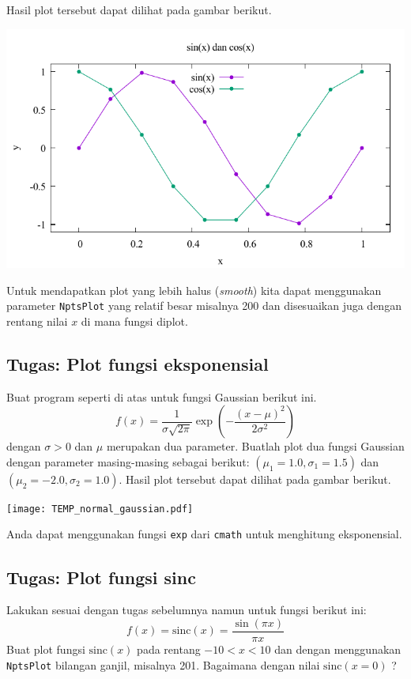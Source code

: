 \documentclass[a4paper,11pt]{extarticle}
\begin{document}
Hasil plot tersebut dapat dilihat pada gambar berikut.

{\centering
\includegraphics[scale=1.0]{sin_cos.pdf}
\par
}

Untuk mendapatkan plot yang lebih halus (\textit{smooth}) kita dapat menggunakan
parameter \texttt{NptsPlot} yang relatif besar misalnya 200 dan disesuaikan juga
dengan rentang nilai $x$ di mana fungsi diplot.


\subsection{Tugas: Plot fungsi eksponensial}

Buat program seperti di atas untuk fungsi Gaussian berikut ini.
\begin{equation}
f(x) = \frac{1}{\sigma\sqrt{2\pi}}\exp\left(-\frac{(x-\mu)^2}{2\sigma^2}\right)
\end{equation}
dengan $\sigma > 0$ dan $\mu$ merupakan dua parameter.
Buatlah plot dua fungsi Gaussian
dengan parameter masing-masing sebagai berikut:
$(\mu_{1}=1.0,\sigma_{1}=1.5)$ dan $(\mu_{2}=-2.0,\sigma_{2}=1.0)$.
Hasil plot tersebut dapat dilihat pada gambar berikut.

{\centering
\texttt{[image: TEMP\_normal\_gaussian.pdf]}
\par}

Anda dapat menggunakan fungsi \texttt{exp} dari \texttt{cmath}
untuk menghitung eksponensial.

\subsection{Tugas: Plot fungsi sinc}
Lakukan sesuai dengan tugas sebelumnya namun untuk fungsi berikut ini:
\begin{equation}
f(x) = \mathrm{sinc}(x) = \frac{\sin(\pi x)}{\pi x}
\end{equation}
Buat plot fungsi $\mathrm{sinc}(x)$ pada rentang $-10 < x < 10$
dan dengan menggunakan \texttt{NptsPlot} bilangan ganjil, misalnya 201.
Bagaimana dengan nilai $\mathrm{sinc}(x=0)$ ?
\end{document}
